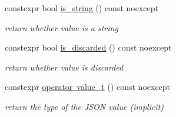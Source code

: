 \begin{DoxyCompactItemize}
constexpr bool \mbox{\hyperlink{classnlohmann_1_1basic__json_a69b596a4a6683b362095c9a139637396}{is\+\_\+string}} () const noexcept
\begin{DoxyCompactList}\small\item\em return whether value is a string \end{DoxyCompactList}\item 
constexpr bool \mbox{\hyperlink{classnlohmann_1_1basic__json_aabe623bc8304c2ba92d96d91f390fab4}{is\+\_\+discarded}} () const noexcept
\begin{DoxyCompactList}\small\item\em return whether value is discarded \end{DoxyCompactList}\item 
constexpr \mbox{\hyperlink{classnlohmann_1_1basic__json_a26ef3058e249f82a04f8ec18f7419027}{operator value\+\_\+t}} () const noexcept
\begin{DoxyCompactList}\small\item\em return the type of the J\+S\+ON value (implicit) \end{DoxyCompactList}\end{DoxyCompactItemize}
